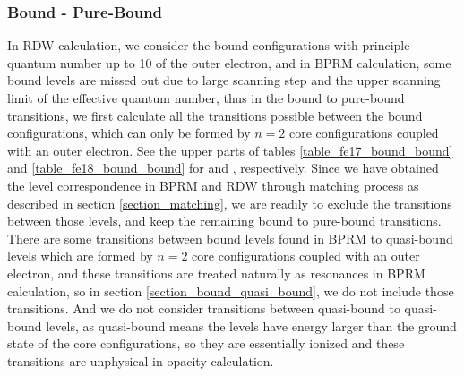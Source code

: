\subsubsection{Bound - Pure-Bound}
In RDW calculation, we consider the bound configurations with principle quantum number up to 10 of the outer electron, and in BPRM calculation, some bound levels are missed out due to large scanning step and the upper scanning limit of the effective quantum number, thus in the bound to pure-bound transitions, we first calculate all the transitions possible between the bound configurations, which can only be formed by $n=2$ core configurations coupled with an outer electron. See the upper parts of tables \ref{table_fe17_bound_bound} and \ref{table_fe18_bound_bound} for  and , respectively. Since we have obtained the level correspondence in BPRM and RDW through matching process as described in section \ref{section_matching}, we are readily to exclude the transitions between those levels, and keep the remaining bound to pure-bound transitions. There are some transitions between bound levels found in BPRM to quasi-bound levels which are formed by $n=2$ core configurations coupled with an outer electron, and these transitions are treated naturally as resonances in BPRM calculation, so in section \ref{section_bound_quasi_bound}, we do not include those transitions.  And we do not consider transitions between quasi-bound to quasi-bound levels, as quasi-bound means the levels have energy larger than the ground state of the core configurations, so they are essentially ionized and these transitions are unphysical in opacity calculation.

